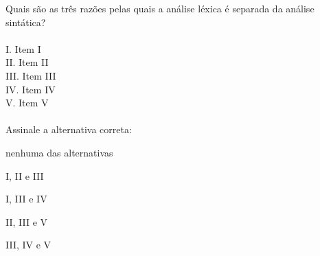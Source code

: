 \question[10]

Quais são as três razões pelas quais a análise léxica é separada da análise sintática?\\
\\
I. Item I\\
II. Item II\\
III. Item III\\
IV. Item IV\\
V. Item V\\
\\
Assinale a alternativa correta:
\begin{choices}
\item nenhuma das alternativas
\item I, II e III
\item I, III e IV
\item II, III e V %
\item III, IV e V
\end{choices}
\answerline


